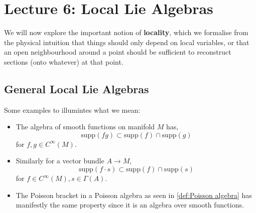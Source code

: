 % 
\newpage
{}
\section{Lecture 6: Local Lie Algebras} %
\label{sec:lecture_6_local_lie_algebras}
% 
We will now explore the important notion of \textbf{locality}, which we formalise from the physical intuition that things should only depend on local variables, or that an open neighbourhood around a point should be sufficient to reconstruct sections (onto whatever) at that point.
% 
\subsection{General Local Lie Algebras} %
\label{sub:general_local_lie_algebras}
% 
\label{def:support}
\label{def:locality}
% 
Some examples to illumintes what we mean:
\begin{itemize}
    \item The algebra of smooth functions on manifold $M$ has,
    \begin{equation*}
        \mathrm{supp}(fg) \subset \mathrm{supp}(f) \cap \mathrm{supp}(g)
    \end{equation*}
    for $f,g \in C^\infty(M)$.
    \item Similarly for a vector bundle $A \rightarrow M$,
    \begin{equation*}
        \mathrm{supp}(f \cdot s  ) \subset \mathrm{supp}(f) \cap \mathrm{supp}(s)
    \end{equation*}
    for $f \in C^\infty(M), s \in \Gamma(A)$.
    \item The Poisson bracket in a Poisson algebra as seen in \cref{def:Poisson algebra} has manifestly the same property since it is an algebra over smooth functions.
\end{itemize}
% 

\label{thm:symbol_squiggle}
